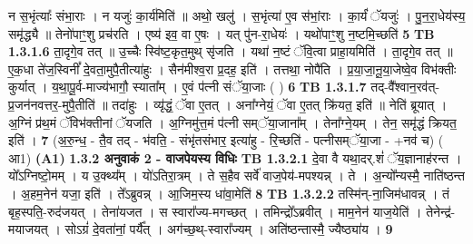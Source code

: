 \documentclass[17pt]{extarticle}
\begin{document}
                  न स॒भृंत्याः᳚ संभा॒राः । न यजुः॑ का॒र्य॑मिति॑ ॥ अथो॒ खलु॑ । स॒भृंत्या॑ ए॒व स॑भां॒राः । का॒र्यं॑ ॅयजुः॑ । पु॒न॒रा॒धेय॑स्य॒ समृ॑द्ध्यै ॥ तेनो॑पाꣳ॒॒शु प्रच॑रति । एष्य॑ इव॒ वा ए॒षः । यत् पु॑न-रा॒धेयः॑ । यथो॑पाꣳ॒॒शु न॒ष्टमि॒च्छति॑ \textbf{ 5} \newline
                  \newline
                                \textbf{ TB 1.3.1.6} \newline
                  ता॒दृगे॒व तत् ॥ उ॒च्चैः स्वि॑ष्ट॒कृत॒मुथ् सृ॑जति । यथा॑ न॒ष्टं ॅवि॒त्वा प्राहा॒यमिति॑ । ता॒दृगे॒व तत् ॥ ए॒क॒धा ते॑ज॒स्विनीं᳚ दे॒वता॒मुपै॒तीत्या॑हुः । सैन॑मीश्व॒रा प्र॒दह॒ इति॑ । तत्तथा॒ नोपै॑ति । प्र॒या॒जा॒नू॒या॒जेष्वे॒व विभ॑क्तीः कुर्यात् । य॒था॒पू॒र्व-माज्य॑भागौ॒ स्याता᳚म् । ए॒वं प॑त्नी संॅया॒जाः ( ) \textbf{ 6} \newline
                  \newline
                                \textbf{ TB 1.3.1.7} \newline
                  तद्-वै᳚श्वान॒रव॑त्-प्र॒जन॑नवत्तर॒-मुपै॒तीति॑ ॥ तदा॑हुः । व्यृ॑द्धं॒ ॅवा ए॒तत् । अना᳚ग्नेयं॒ ॅवा ए॒तत् क्रि॑यत॒ इति॑ ॥ नेति॑ ब्रूयात् । अ॒ग्निं प्र॑थ॒मं ॅविभ॑क्तीनां ॅयजति । अ॒ग्निमु॑त्त॒मं प॑त्नी सम्ॅया॒जाना᳚म् । तेना᳚ग्ने॒यम् । तेन॒ समृ॑द्धं क्रियत॒ इति॑ । \textbf{ 7} \newline
                  \newline
                                    (अ॒रु॒न्ध॒ - तै॒व तद् - भ॑वति॒ - संभृ॑तसंभार॒ इत्या॑हु - रि॒च्छति॑ - पत्नीसम्ॅया॒जा - +नव॑ च) ( आ1) \textbf{(A1)} \newline \newline
                \textbf{ 1.3.2      अनुवाकं   2 - वाजपेयस्य विधिः} \newline
                                \textbf{ TB 1.3.2.1} \newline
                  दे॒वा वै यथा॒दर्.शं॑ ॅय॒ज्ञानाह॑रन्त । यो᳚ऽग्निष्टो॒मम् । य उ॒क्थ्य᳚म् । यो॑ऽतिरा॒त्रम् । ते स॒हैव सर्वे॑ वाज॒पेय॑-मपश्यन्न् । ते । अ॒न्यो᳚न्यस्मै॒ नाति॑ष्ठन्त । अ॒हम॒नेन॑ यजा॒ इति॑ । ते᳚ऽब्रुवन्न् । आ॒जिम॒स्य धा॑वा॒मेति॑ \textbf{ 8} \newline
                  \newline
                                \textbf{ TB 1.3.2.2} \newline
                  तस्मि॑न्-ना॒जिम॑धावन्न् । तं बृह॒स्पति॒-रुद॑जयत् । तेना॑यजत । स स्वारा᳚ज्य-मगच्छत् । तमिन्द्रो᳚ऽब्रवीत् । माम॒नेन॑ याज॒येति॑ । तेनेन्द्र॑-मयाजयत् । सोऽग्रं॑ दे॒वता॑नां॒ पर्यै᳚त् । अग॑च्छ॒थ्-स्वारा᳚ज्यम् । अति॑ष्ठन्तास्मै॒ ज्यैष्ठ्या॑य । \textbf{ 9} \newline
\end{document}
